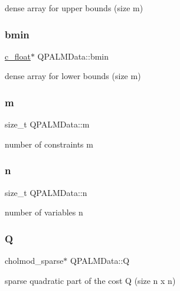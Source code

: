 dense array for upper bounds (size m) 

\mbox{\label{structQPALMData_a60dd17db336a4267f86b0b913a82bc83}} 
\subsubsection{\texorpdfstring{bmin}{bmin}}
{\footnotesize\ttfamily \mbox{\hyperlink{global__opts_8h_a7f1a9fda95e52979658c20a0d134fb15}{c\+\_\+float}}$\ast$ Q\+P\+A\+L\+M\+Data\+::bmin}



dense array for lower bounds (size m) 

\mbox{\label{structQPALMData_a1adf9ac40f4560e8d7d4b5b59efacb2e}} 
\subsubsection{\texorpdfstring{m}{m}}
{\footnotesize\ttfamily size\+\_\+t Q\+P\+A\+L\+M\+Data\+::m}



number of constraints m 

\mbox{\label{structQPALMData_a8a238460cbd7dd6571ac594b92a946cf}} 
\subsubsection{\texorpdfstring{n}{n}}
{\footnotesize\ttfamily size\+\_\+t Q\+P\+A\+L\+M\+Data\+::n}



number of variables n 

\mbox{\label{structQPALMData_a9b440bae03198195823e1e3f5154a611}} 
\subsubsection{\texorpdfstring{Q}{Q}}
{\footnotesize\ttfamily cholmod\+\_\+sparse$\ast$ Q\+P\+A\+L\+M\+Data\+::Q}



sparse quadratic part of the cost Q (size n x n) 

